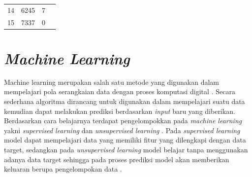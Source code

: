 \begin{table}[h]
\begin{tabular}{|c|c|c|c|}
		\cline{1-3}
		14          & 6245                                                                             & 7                                                                                      &                                                              \\ 
		\cline{1-3}
		15          & 7337                                                                             & 0                                                                                      &                                                              \\
		\hline
	\end{tabular}
\end{table}







\section{\textit{Machine Learning}}
Machine learning merupakan salah satu metode yang digunakan dalam mempelajari pola serangkaian data dengan proses komputasi digital \cite{jordan2015machine}. Secara sederhana algoritma dirancang untuk digunakan dalam mempelajari suatu data kemudian dapat melakukan prediksi berdasarkan \textit{input} baru yang diberikan. Berdasarkan cara belajarnya terdapat pengelompokkan pada \textit{machine learning} yakni \textit{supervised learning} dan \textit{unsupervised learning} . Pada \textit{supervised learning} model dapat mempelajari data yang memiliki fitur yang dilengkapi dengan data target, sedangkan pada \textit{unsupervised learning} model belajar tanpa menggunakan adanya data target sehingga pada proses prediksi model akan memberikan keluaran berupa pengelompokan data \cite{alpaydin2020introduction}.

